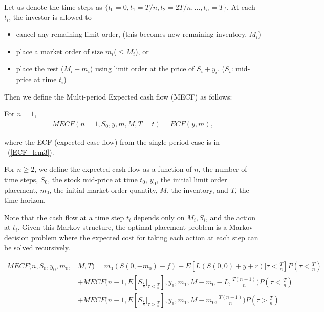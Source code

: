 \documentclass[11pt]{article}
\theoremstyle{plain}
\numberwithin{equation}{section}
\begin{document}
\par Let us denote the time steps as $\{ t_0=0, t_1=T/n, t_2=2T/n, \dots, t_n=T \}$. At each $t_i$, the investor is allowed to 

\begin{itemize}
\item cancel any remaining limit order, (this becomes new remaining inventory, $M_i$)
\item place a market order of size $m_i$($\leq M_i$), or
\item place the rest ($M_i-m_i$) using  limit order at the price of $S_i+y_i$. ($S_i$: mid-price at time $t_i$)
\end{itemize}


Then we define the Multi-period Expected cash flow (MECF) as follows:



\par For $n=1$, 
\begin{align}\label{multi:mecf1:n1}
MECF(n=1,S_0,y,m,M,T=t)=ECF(y,m),
\end{align}


where the ECF (expected case flow) from the single-period case is in ~(\ref{ECF_lem3}). 



\par For $n\geq 2$, we define the expected cash flow as a function of $n$, the number of time steps, $S_0$, the stock mid-price at time $t_0$, $y_0$, the initial limit order placement, $m_0$, the initial market order quantity, $M$, the inventory, and $T$, the time horizon.


{ Note that the cash flow at a time step $t_i$ depends only on $M_i, S_i$, and the action at $t_i$. Given this Markov structure, the optimal placement problem is a Markov decision problem where the expected cost for taking each action at each step can be solved recursively.

}


\begin{align}
\label{multi:mecf1:line1}
MECF (n, S_0,y_0, m_0, & M,T)=m_0\left(S(0,-m_0)-f  \right) 
+ E\left[L(S(0,0)+y+r)\bigg|\tau<\frac{T}{n} \right] P\left(\tau<\frac{T}{n}\right)
\\
\label{multi:mecf1:line2}
  &+MECF\bigg(n-1,E[{S_{\frac{T}{n}}\big|_{\tau<\frac{T}{n}}}],y_1,m_1,M-m_0-L, \frac{T(n-1)}{n}\bigg)P\left(\tau<\frac{T}{n}\right)\\
  \label{multi:mecf1:line3}
   &+
 MECF\bigg(n-1,E[{S_{\frac{T}{n}}\big|_{\tau>\frac{T}{n}}}],y_1,m_1,M-m_0, \frac{T(n-1)}{n}\bigg)P\left(\tau>\frac{T}{n}\right)
\end{align}
\end{document}

